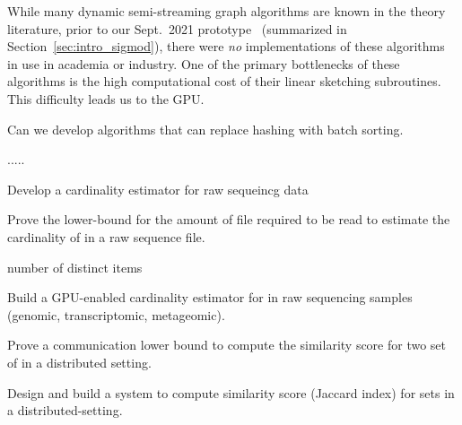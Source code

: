 While many dynamic semi-streaming graph algorithms\cite{Ahn2012, Ahn2012_2, AhnGM13, GuhaMT15, KapralovLMMS13, ChitnisCEHMMV16, AssadiKL16, McGregorVV16, pagh2012colorful, 10.1007/978-3-662-48054-0_39, clustering, 10.1007/978-3-319-21398-9_57, streamsetbounds, Chakrabarti2015IncidenceGA, kveton2016graphical, CrouchMS13} are known in the theory literature, prior to our Sept.\ 2021 prototype~\cite{graphzeppelin} (summarized in Section~\ref{sec:intro_sigmod}), there were \emph{no} implementations of these algorithms in use in academia or industry.  One of the primary bottlenecks of these algorithms is the high computational cost of their linear sketching subroutines. This difficulty leads us to the GPU.


\begin{rproblem}
Can we develop algorithms that can replace hashing with batch sorting.
\end{rproblem}



.....



\begin{rproblem}
Develop a cardinality estimator for raw sequeincg data 

Prove the lower-bound for the amount of file required to be read to estimate the cardinality of \kmer in a raw sequence file.
\end{rproblem}

number of distinct items

\begin{rproblem}
Build a GPU-enabled cardinality estimator for \kmers in raw sequencing samples (genomic, transcriptomic, metageomic).
\end{rproblem}

\begin{rproblem}
Prove a communication lower bound to compute the similarity score for two set of \kmers in a distributed setting.
\end{rproblem}


\begin{rproblem}
Design and build a system to compute similarity score (Jaccard index) for \kmer sets in a distributed-setting.
\end{rproblem}
